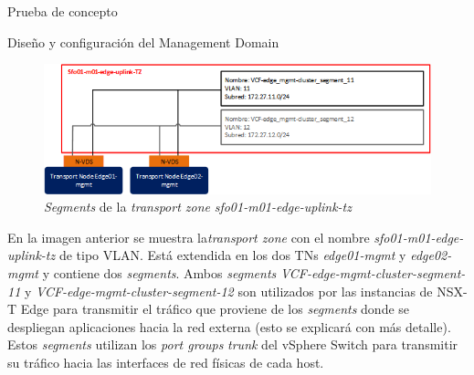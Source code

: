 \begin{section}{Prueba de concepto}
\begin{subsection}{Diseño y configuración del Management Domain}
    \begin{figure}[h]
      \centering
      \includegraphics[width=1\textwidth]{imaxes/pruebaconcepto/VLANTZSegments.png}
       \caption{\textit{Segments} de la  \textit{transport zone} \textit{sfo01-m01-edge-uplink-tz}}
      \label{fig:VLAN-TZ-segments-NSXT}
    \end{figure}
    \FloatBarrier
    En la imagen anterior se muestra la\textit{transport zone} con el nombre \textit{sfo01-m01-edge-uplink-tz} de tipo VLAN. Está extendida en los dos TNs \textit{edge01-mgmt} y \textit{edge02-mgmt} y contiene dos \textit{segments}. Ambos \textit{segments} \textit{VCF-edge-mgmt-cluster-segment-11} y \textit{VCF-edge-mgmt-cluster-segment-12} son utilizados por las instancias de NSX-T Edge para transmitir el tráfico que proviene de los \textit{segments} donde se despliegan aplicaciones hacia la red externa (esto se explicará con más detalle). Estos \textit{segments} utilizan los \textit{port groups} \textit{trunk} del vSphere Switch para transmitir su tráfico hacia las interfaces de red físicas de cada host.

\end{subsection}
\end{section}
